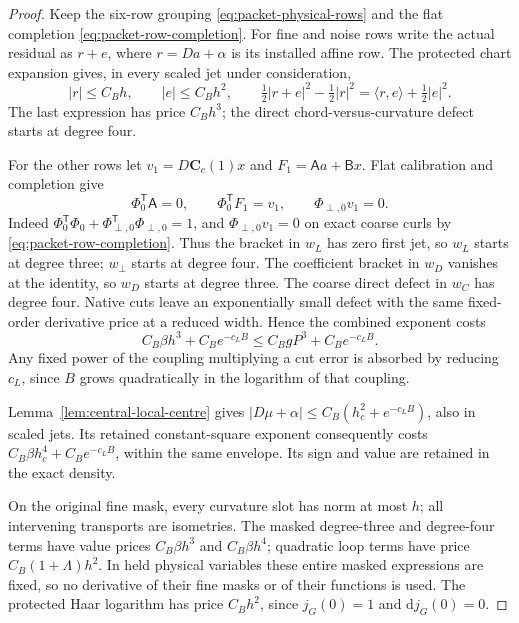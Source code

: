 \documentclass[11pt,reqno]{amsart}
\numberwithin{equation}{section}
\theoremstyle{definition}
\theoremstyle{remark}
\newcommand{\dd}{\mathrm d}
\begin{document}
\begin{proof}
Keep the six-row grouping \eqref{eq:packet-physical-rows} and the
flat completion \eqref{eq:packet-row-completion}. For fine
and noise rows write the actual residual as \(r+e\), where
\(r=Da+\alpha\) is its installed affine row. The protected
chart expansion gives, in every scaled jet under consideration,
\[
 |r|\le C_Bh,\qquad |e|\le C_Bh^2,\qquad
 \tfrac12|r+e|^2-\tfrac12|r|^2
                         =\langle r,e\rangle+\tfrac12|e|^2.
\]
The last expression has price \(C_Bh^3\); the direct
chord-versus-curvature defect starts at degree four.

For the other rows let \(v_1=D\mathbf C_c(1)x\) and
\(F_1=\mathsf Aa+\mathsf Bx\). Flat calibration and completion
give
\[
 \Phi_0^{\mathsf T}\mathsf A=0,\qquad \Phi_0^{\mathsf T}F_1=v_1,
                                  \qquad \Phi_{\perp,0}v_1=0.
\]
Indeed \(\Phi_0^{\mathsf T}\Phi_0+\Phi_{\perp,0}^{\mathsf T}\Phi_{\perp,0}=1\),
and \(\Phi_{\perp,0}v_1=0\) on exact coarse curls by
\eqref{eq:packet-row-completion}. Thus the bracket in \(w_L\)
has zero first jet, so \(w_L\) starts at degree three;
\(w_\perp\) starts at degree four. The coefficient bracket
in \(w_D\) vanishes at the identity, so \(w_D\) starts at
degree three. The coarse direct defect in \(w_C\) has degree
four. Native cuts leave an exponentially small defect with
the same fixed-order derivative price at a reduced width.
Hence the combined exponent costs
\[
 C_B\beta h^3+C_Be^{-c_LB}
                       \le C_BgP^3+C_Be^{-c_LB}.
\]
Any fixed power of the coupling multiplying a cut error is
absorbed by reducing \(c_L\), since \(B\) grows quadratically
in the logarithm of that coupling.

Lemma~\ref{lem:central-local-centre} gives
\(|D\mu+\alpha|\le C_B(h_c^2+e^{-c_LB})\), also in scaled
jets. Its retained constant-square exponent consequently
costs \(C_B\beta h_c^4+C_Be^{-c_LB}\), within the same
envelope. Its sign and value are retained in the exact density.

On the original fine mask, every curvature slot has norm
at most \(h\); all intervening transports are isometries.
The masked degree-three and degree-four terms have value
prices \(C_B\beta h^3\) and \(C_B\beta h^4\); quadratic
loop terms have price \(C_B(1+\Lambda)h^2\). In held physical
variables these entire masked expressions are fixed, so no
derivative of their fine masks or of their functions is used.
The protected Haar logarithm has price \(C_Bh^2\), since
\(j_G(0)=1\) and \(\dd j_G(0)=0\).


\end{proof}
\end{document}

